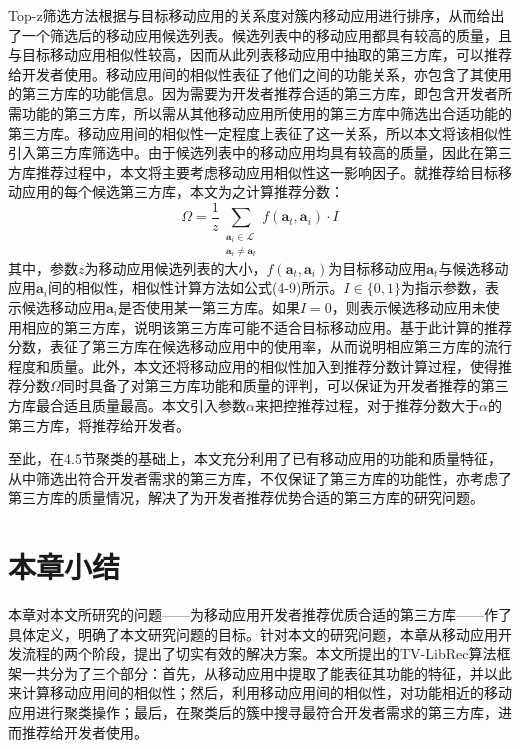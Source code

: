 Top-z筛选方法根据与目标移动应用的关系度对簇内移动应用进行排序，从而给出了一个筛选后的移动应用候选列表。候选列表中的移动应用都具有较高的质量，且与目标移动应用相似性较高，因而从此列表移动应用中抽取的第三方库，可以推荐给开发者使用。移动应用间的相似性表征了他们之间的功能关系，亦包含了其使用的第三方库的功能信息。因为需要为开发者推荐合适的第三方库，即包含开发者所需功能的第三方库，所以需从其他移动应用所使用的第三方库中筛选出合适功能的第三方库。移动应用间的相似性一定程度上表征了这一关系，所以本文将该相似性引入第三方库筛选中。由于候选列表中的移动应用均具有较高的质量，因此在第三方库推荐过程中，本文将主要考虑移动应用相似性这一影响因子。就推荐给目标移动应用的每个候选第三方库，本文为之计算推荐分数：
\begin{equation}
\Omega = \frac{1}{z} \sum_{\substack{\mathbf{a}_i \in \mathcal{L} \\ \mathbf{a}_i \neq \mathbf{a}_t}} f(\mathbf{a}_t, \mathbf{a}_i) \cdot I
\end{equation}
其中，参数$z$为移动应用候选列表的大小，$f(\mathbf{a}_t, \mathbf{a}_i)$为目标移动应用$\mathbf{a}_t$与候选移动应用$\mathbf{a}_i$间的相似性，相似性计算方法如公式(4-9)所示。$I \in \{0,1\}$为指示参数，表示候选移动应用$\mathbf{a}_i$是否使用某一第三方库。如果$I = 0$，则表示候选移动应用未使用相应的第三方库，说明该第三方库可能不适合目标移动应用。基于此计算的推荐分数，表征了第三方库在候选移动应用中的使用率，从而说明相应第三方库的流行程度和质量。此外，本文还将移动应用的相似性加入到推荐分数计算过程，使得推荐分数$\Omega$同时具备了对第三方库功能和质量的评判，可以保证为开发者推荐的第三方库最合适且质量最高。本文引入参数$\alpha$来把控推荐过程，对于推荐分数大于$\alpha$的第三方库，将推荐给开发者。

至此，在4.5节聚类的基础上，本文充分利用了已有移动应用的功能和质量特征，从中筛选出符合开发者需求的第三方库，不仅保证了第三方库的功能性，亦考虑了第三方库的质量情况，解决了为开发者推荐优势合适的第三方库的研究问题。



\section{本章小结}
本章对本文所研究的问题——为移动应用开发者推荐优质合适的第三方库——作了具体定义，明确了本文研究问题的目标。针对本文的研究问题，本章从移动应用开发流程的两个阶段，提出了切实有效的解决方案。本文所提出的TV-LibRec算法框架一共分为了三个部分：首先，从移动应用中提取了能表征其功能的特征，并以此来计算移动应用间的相似性；然后，利用移动应用间的相似性，对功能相近的移动应用进行聚类操作；最后，在聚类后的簇中搜寻最符合开发者需求的第三方库，进而推荐给开发者使用。

